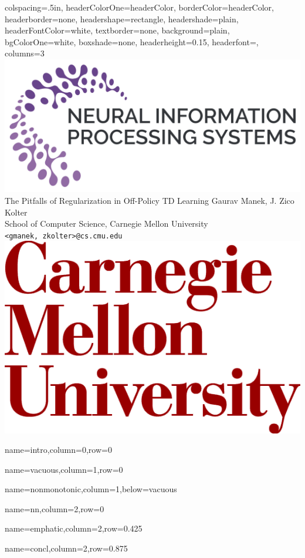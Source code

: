 \documentclass[landscape,paperwidth=96in,paperheight=48in,fontscale=0.2]{baposter}
\begin{document}
\begin{poster}{
    colspacing=.5in,
    headerColorOne=headerColor, borderColor=headerColor,
    headerborder=none, headershape=rectangle,
    headershade=plain, headerFontColor=white, textborder=none,
    background=plain, bgColorOne=white, boxshade=none,
    headerheight=0.15\textheight,
    headerfont=\headerfont,
    columns=3
  }{
    \includegraphics[height=0.11\textheight]{images/neurips-logo}
  }{
    {{\titlefont The Pitfalls of Regularization in Off-Policy TD Learning }}
  }{\vspace{2mm}\large
    Gaurav Manek, J. Zico Kolter \\
    School of Computer Science, Carnegie Mellon University \\
    \texttt{<gmanek, zkolter>@cs.cmu.edu}
  }{\includegraphics[height=0.11\textheight]{images/cmu-logo}}

  {name=intro,column=0,row=0}{}

  {name=vacuous,column=1,row=0}{}

  {name=nonmonotonic,column=1,below=vacuous}{}

  {name=nn,column=2,row=0}{}

  {name=emphatic,column=2,row=0.425}{}

  {name=concl,column=2,row=0.875}{}


\end{poster}
\end{document}
